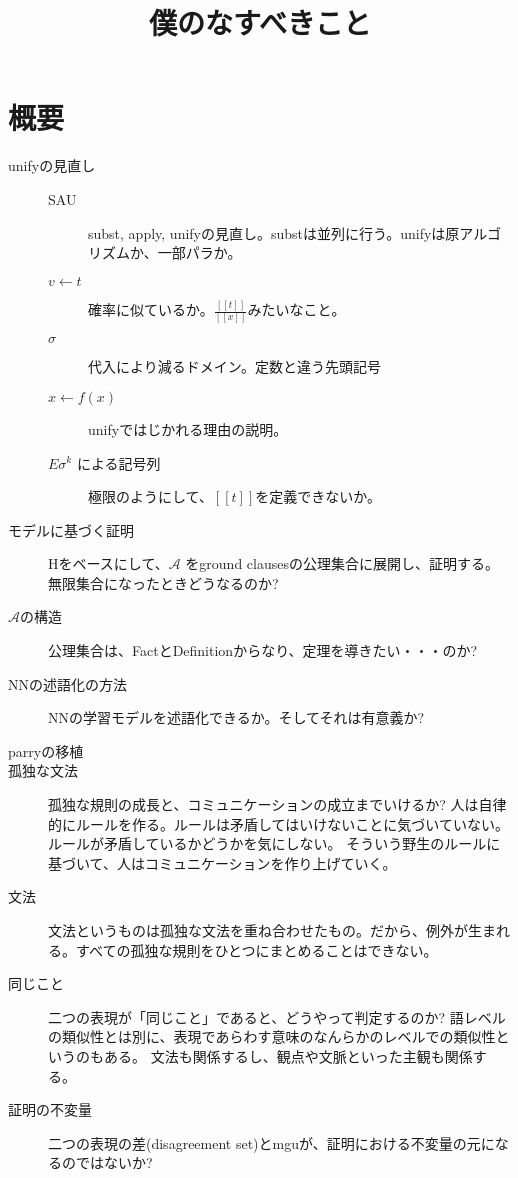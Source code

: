 \documentclass[10pt, oneside]{jarticle}   	%
\title{僕のなすべきこと}
\author{\myname}
\begin{document}
\maketitle

\section{概要}
\begin{description}
\item[unifyの見直し] 
\begin{description}
\item[ SAU] subst, apply, unifyの見直し。substは並列に行う。unifyは原アルゴリズムか、一部パラか。 
\item[ $v \leftarrow t$] 確率に似ているか。$\frac{[[t]]}{[[x]]}$みたいなこと。
\item[  $\sigma$] 代入により減るドメイン。定数と違う先頭記号
\item[ $x\leftarrow f(x)$]  unifyではじかれる理由の説明。
\item[ $E\sigma^k$ による記号列] 極限のようにして、$[[t]]$を定義できないか。
\end{description}

\item[ モデルに基づく証明] Hをベースにして、$\mathcal{A}$ をground clausesの公理集合に展開し、証明する。
無限集合になったときどうなるのか?
\item[ $\mathcal{A}$の構造] 公理集合は、FactとDefinitionからなり、定理を導きたい・・・のか?
\item[ NNの述語化の方法] NNの学習モデルを述語化できるか。そしてそれは有意義か?
\item[ parryの移植] 
\item[ 孤独な文法] 孤独な規則の成長と、コミュニケーションの成立までいけるか?
人は自律的にルールを作る。ルールは矛盾してはいけないことに気づいていない。ルールが矛盾しているかどうかを気にしない。
そういう野生のルールに基づいて、人はコミュニケーションを作り上げていく。
\item[ 文法] 文法というものは孤独な文法を重ね合わせたもの。だから、例外が生まれる。すべての孤独な規則をひとつにまとめることはできない。

\item[同じこと] 二つの表現が「同じこと」であると、どうやって判定するのか?
語レベルの類似性とは別に、表現であらわす意味のなんらかのレベルでの類似性というのもある。
文法も関係するし、観点や文脈といった主観も関係する。

\item[ 証明の不変量] 二つの表現の差(disagreement set)とmguが、証明における不変量の元になるのではないか?


\end{description}
\end{document}
